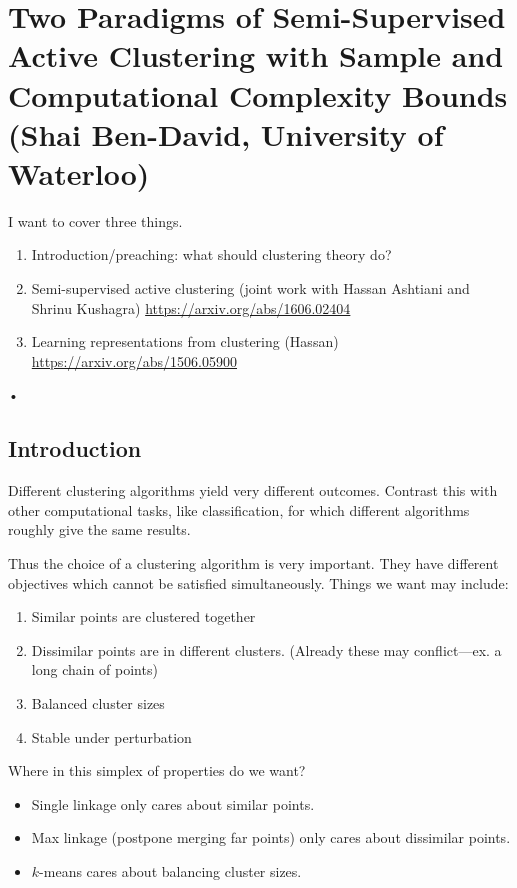 \section{Two Paradigms of Semi-Supervised Active Clustering with Sample and Computational Complexity Bounds (Shai Ben-David, University of Waterloo)}

I want to cover three things.
\begin{enumerate}
\item
Introduction/preaching: what should clustering theory do? 
\item
Semi-supervised active clustering (joint work with Hassan Ashtiani and Shrinu Kushagra) \cite{ashtiani2016clustering}
\url{https://arxiv.org/abs/1606.02404}
\item
Learning representations from clustering (Hassan)
\cite{ashtiani2015representation} \url{https://arxiv.org/abs/1506.05900}
\end{enumerate}•

\subsection{Introduction}

Different clustering algorithms yield very different outcomes. Contrast this with other computational tasks, like classification, for which different algorithms roughly give the same results.

Thus the choice of a clustering algorithm is very important. They have different objectives which cannot be satisfied simultaneously. Things we want may include:
\begin{enumerate}
\item
Similar points are clustered together
\item
Dissimilar points are in different clusters.
(Already these may conflict---ex. a long chain of points)
\item
Balanced cluster sizes
\item
Stable under perturbation
\end{enumerate}
Where in this simplex of properties do we want?
\begin{itemize}
\item
Single linkage only cares about similar points.
\item
Max linkage (postpone merging far points) only cares about dissimilar points.
\item
$k$-means cares about balancing cluster sizes.
\end{itemize}


